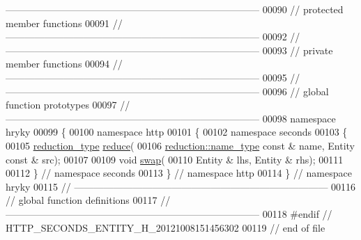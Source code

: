 \begin{DoxyCode}
{      ------------------------------------------------------------------------------}
00090 \textcolor{comment}{// protected member functions}
00091 \textcolor{comment}{//
      ------------------------------------------------------------------------------}
00092 \textcolor{comment}{//
      ------------------------------------------------------------------------------}
00093 \textcolor{comment}{// private member functions}
00094 \textcolor{comment}{//
      ------------------------------------------------------------------------------}
00095 \textcolor{comment}{//
      ------------------------------------------------------------------------------}
00096 \textcolor{comment}{// global function prototypes}
00097 \textcolor{comment}{//
      ------------------------------------------------------------------------------}
00098 \textcolor{keyword}{namespace }hryky
00099 \{
00100 \textcolor{keyword}{namespace }http
00101 \{
00102 \textcolor{keyword}{namespace }seconds
00103 \{
00105     \hyperlink{namespacehryky_a343a9a4c36a586be5c2693156200eadc}{reduction_type} \hyperlink{namespacehryky_1_1http_a08fc36a78a8e2908140fcd102829a566}{reduce}(
00106         \hyperlink{namespacehryky_1_1reduction_ac686c30a4c8d196bbd0f05629a6b921f}{reduction::name_type} \textcolor{keyword}{const} & name, Entity \textcolor{keyword}{const} & src);
00107 
00109     \textcolor{keywordtype}{void} \hyperlink{namespacehryky_1_1http_a38e62595ad532d18fbc65ceb61973aec}{swap}(
00110         Entity & lhs, Entity & rhs);
00111 
00112 \} \textcolor{comment}{// namespace seconds}
00113 \} \textcolor{comment}{// namespace http}
00114 \} \textcolor{comment}{// namespace hryky}
00115 \textcolor{comment}{//
      ------------------------------------------------------------------------------}
00116 \textcolor{comment}{// global function definitions}
00117 \textcolor{comment}{//
      ------------------------------------------------------------------------------}
00118 \textcolor{preprocessor}{#endif // HTTP\_SECONDS\_ENTITY\_H\_20121008151456302}
00119 \textcolor{preprocessor}{}\textcolor{comment}{// end of file}
\end{DoxyCode}
